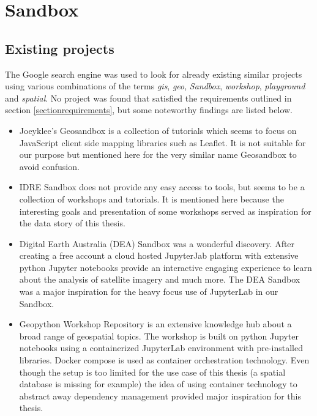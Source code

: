 \documentclass[11pt, a4paper, oneside, parskip=full-]{scrartcl}
\begin{document}
\section{Sandbox}

\subsection{Existing projects}
The Google search engine was used to look for already existing similar projects
using various combinations of the terms \emph{gis}, \emph{geo}, \emph{Sandbox},
\emph{workshop}, \emph{playground} and \emph{spatial}. No project was found that
satisfied the requirements outlined in section \ref{sectionrequirements}, but
some noteworthy findings are listed below.

\begin{itemize}
  \item Joeyklee's Geosandbox\cite{project-joeyklee} is a collection of
  tutorials which seems to focus on JavaScript client side mapping libraries
  such as Leaflet. It is not suitable for our purpose but mentioned here for the
  very similar name Geosandbox to avoid confusion.
  \item IDRE Sandbox\cite{project-idre} does not provide any easy access to
  tools, but seems to be a collection of workshops and tutorials. It is
  mentioned here because the interesting goals and presentation of some
  workshops served as inspiration for the data story of this thesis.
  \item Digital Earth Australia (DEA) Sandbox\cite{project-dea} was a wonderful
  discovery. After creating a free account a cloud hosted JupyterJab platform
  with extensive python Jupyter notebooks provide an interactive engaging
  experience to learn about the analysis of satellite imagery and much more. The
  DEA Sandbox was a major inspiration for the heavy focus use of
  JupyterLab\cite{jupyterlab} in our Sandbox.
  \item Geopython Workshop Repository\cite{project-geopython} is an extensive
  knowledge hub about a broad range of geospatial topics. The workshop is built
  on python Jupyter notebooks using a containerized JupyterLab environment with
  pre-installed libraries. Docker compose is used as container orchestration
  technology. Even though the setup is too limited for the use case of this
  thesis (a spatial database is missing for example) the idea of using container
  technology to abstract away dependency management provided major inspiration
  for this thesis.
\end{itemize}
\end{document}
